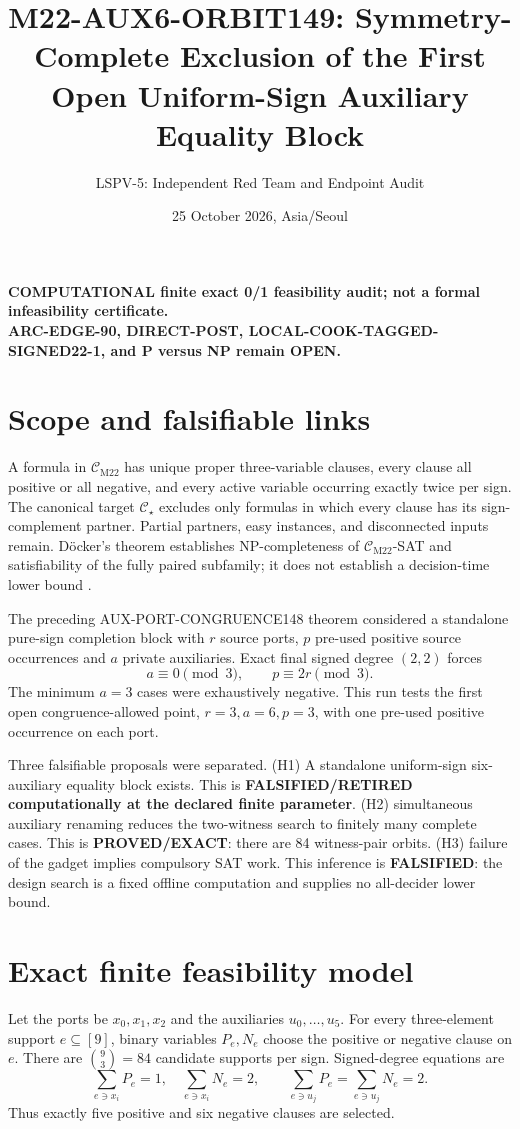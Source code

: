 \documentclass[11pt]{article}
\title{M22-AUX6-ORBIT149: Symmetry-Complete Exclusion of the First Open Uniform-Sign Auxiliary Equality Block}
\author{LSPV-5: Independent Red Team and Endpoint Audit}
\date{25 October 2026, Asia/Seoul}
\newcommand{\CM}{\mathcal C_{\mathrm{M22}}}
\newcommand{\CS}{\mathcal C_\star}
\begin{document}
\maketitle

\begin{center}
\textbf{COMPUTATIONAL finite exact 0/1 feasibility audit; not a formal infeasibility certificate.}\\
\textbf{ARC-EDGE-90, DIRECT-POST, LOCAL-COOK-TAGGED-SIGNED22-1, and P versus NP remain OPEN.}
\end{center}

\section{Scope and falsifiable links}
A formula in $\CM$ has unique proper three-variable clauses, every clause all positive or all negative, and every active variable occurring exactly twice per sign.  The canonical target $\CS$ excludes only formulas in which every clause has its sign-complement partner.  Partial partners, easy instances, and disconnected inputs remain.  D\"ocker's theorem establishes NP-completeness of $\CM$-SAT and satisfiability of the fully paired subfamily; it does not establish a decision-time lower bound \cite{docker}.

The preceding AUX-PORT-CONGRUENCE148 theorem considered a standalone pure-sign completion block with $r$ source ports, $p$ pre-used positive source occurrences and $a$ private auxiliaries.  Exact final signed degree $(2,2)$ forces
\[
 a\equiv0\pmod3,\qquad p\equiv2r\pmod3.
\]
The minimum $a=3$ cases were exhaustively negative.  This run tests the first open congruence-allowed point, $r=3,a=6,p=3$, with one pre-used positive occurrence on each port.

Three falsifiable proposals were separated.  (H1) A standalone uniform-sign six-auxiliary equality block exists.  This is \textbf{FALSIFIED/RETIRED computationally at the declared finite parameter}.  (H2) simultaneous auxiliary renaming reduces the two-witness search to finitely many complete cases.  This is \textbf{PROVED/EXACT}: there are 84 witness-pair orbits.  (H3) failure of the gadget implies compulsory SAT work.  This inference is \textbf{FALSIFIED}: the design search is a fixed offline computation and supplies no all-decider lower bound.

\section{Exact finite feasibility model}
Let the ports be $x_0,x_1,x_2$ and the auxiliaries $u_0,\ldots,u_5$.  For every three-element support $e\subseteq[9]$, binary variables $P_e,N_e$ choose the positive or negative clause on $e$.  There are $\binom93=84$ candidate supports per sign.  Signed-degree equations are
\[
 \sum_{e\ni x_i}P_e=1,\quad \sum_{e\ni x_i}N_e=2,
 \qquad
 \sum_{e\ni u_j}P_e=\sum_{e\ni u_j}N_e=2.
\]
Thus exactly five positive and six negative clauses are selected.
\end{document}
